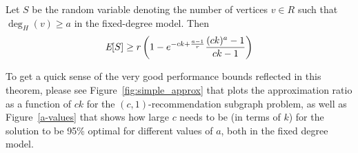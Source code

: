 \begin{thm}\label{original_result}
Let $S$ be the
random variable denoting the number of vertices $v \in R$ such that
$\deg_{H}(v)\geq a$ in the fixed-degree model. Then
\[ \emph{\text{E}}[S] \geq r\left(1-e^{-ck+\frac{a-1}{r}}\frac{(ck)^a-1}{ck-1}\right)  \]
\end{thm}

To get a quick sense of the very good performance bounds reflected in this theorem, please see Figure~\ref{fig:simple_approx} that plots the approximation ratio as a function of $ck$ for the $(c,1)$-recommendation subgraph problem, as well as Figure~\ref{a-values} that shows how large $c$ needs to be (in terms of $k$) for the
solution to be 95\% optimal for different values of $a$, both in the fixed degree model.\vs

%
%
%
%
%
%

